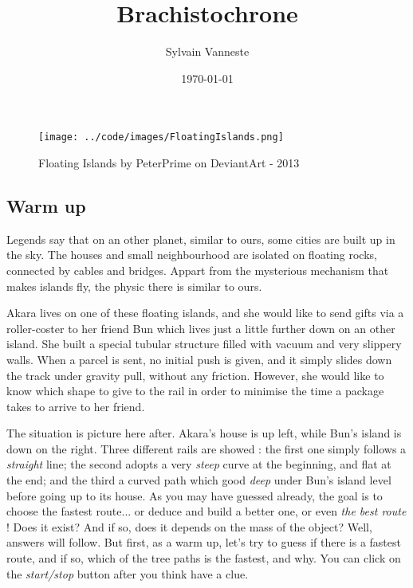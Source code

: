 \documentclass{article}
\title{Brachistochrone}
\author{Sylvain Vanneste}
\date\today
\begin{document}
\maketitle %


\begin{figure}[h]
\begin{center}
\texttt{[image: ../code/images/FloatingIslands.png]}
\end{center}
\caption{Floating Islands by PeterPrime on DeviantArt - 2013}
\end{figure}

\subsection*{Warm up}

Legends say that on an other planet, similar to ours, some cities are built up in the sky. The houses and small neighbourhood are isolated on floating rocks, connected by cables and bridges. Appart from the mysterious mechanism that makes islands fly, the physic there is similar to ours.

Akara lives on one of these floating islands, and she would like to send gifts via a roller-coster to her friend Bun which lives just a little further down on an other island. She built a special tubular structure filled with vacuum and very slippery walls. When a parcel is sent, no initial push is given, and it simply slides down the track under gravity pull, without any friction. However, she would like to know which shape to give to the rail in order to minimise the time a package takes to arrive to her friend.

The situation is picture here after. Akara's house is up left, while Bun's island is down on the right. Three different rails are showed : the first one simply follows a \textit{straight} line; the second adopts a very \textit{steep} curve at the beginning, and flat at the end; and the third a curved path which good \textit{deep} under Bun's island level before going up to its house. As you may have guessed already, the goal is to choose the fastest route... or deduce and build a better one, or even \textit{the best route} ! Does it exist? And if so, does it depends on the mass of the object? Well, answers will follow. But first, as a warm up, let's try to guess if there is a fastest route, and if so, which of the tree paths is the fastest, and why. You can click on the \textit{start/stop} button after you think have a clue.
\end{document}
